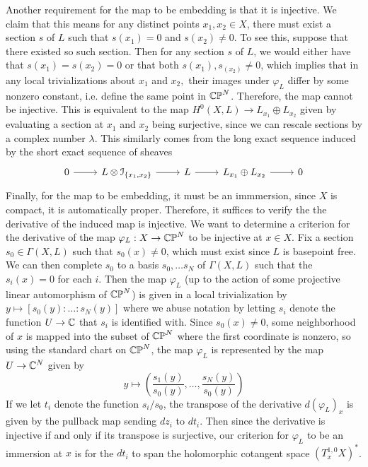 Another requirement for the map to be embedding is that it is injective.
We claim that this means for any distinct points $x_1,x_2 \in X$, there must exist
a section $s$ of $L$ such that $s(x_1) = 0$ and $s(x_2) \neq 0$. To see this,
suppose that there existed so such section. Then for any section $s$ of $L$,
we would either have that $s(x_1) = s(x_2) = 0$ or that both $s(x_1),s_(x_2) \neq 0$,
which implies that in any local trivializations about $x_1$ and $x_2,$ their images
under $\varphi_L$ differ by some nonzero constant, i.e. define the same point in $\mathbb{CP}^N$.
Therefore, the map cannot be injective. This is equivalent
to the map $H^0(X,L) \to L_{x_1} \oplus L_{x_2}$ given by evaluating a section
at $x_1$ and $x_2$ being surjective, since we can rescale sections by a complex
number $\lambda$. This similarly comes from the long exact sequence induced
by the short exact sequence of sheaves
\[\begin{tikzcd}
0 \ar[r] & L \otimes \mathcal{I}_{\set{x_1,x_2}} \ar[r] & L \ar[r]
& L_{x_1} \oplus L_{x_2} \ar[r] & 0
\end{tikzcd}\]
Finally, for the map to be embedding, it must be an immmersion, since $X$ is
compact, it is automatically proper. Therefore, it suffices to verify the the
derivative of the induced map is injective. We want to determine a criterion
for the derivative of the map $\varphi_L : X \to \mathbb{CP}^N$ to be injective at $x \in X$.
Fix a section $s_0 \in \Gamma(X,L)$ such that $s_0(x) \neq 0$, which must exist
since $L$ is basepoint free. We can then complete $s_0$ to a basis
$s_0, \ldots s_N$ of $\Gamma(X,L)$ such that the $s_i(x) = 0$ for each $i$.
Then the map $\varphi_L$ (up to the action of some projective linear automorphism
of $\mathbb{CP}^N$) is given in a local trivialization by $y \mapsto [s_0(y):\ldots : s_N(y)]$
where we abuse notation by letting $s_i$ denote the function $U \to \mathbb{C}$ that $s_i$ is
identified with. Since $s_0(x) \neq 0$, some neighborhood of $x$ is mapped into the
subset of $\mathbb{CP}^N$ where the first coordinate is nonzero, so using the standard
chart on $\mathbb{CP}^N$, the map $\varphi_L$ is represented by the map $U \to \mathbb{C}^N$
given by
\[
y \mapsto \left(\frac{s_1(y)}{s_0(y)},\ldots , \frac{s_N(y)}{s_0(y)}\right)
\]
If we let $t_i$ denote the function $s_i/s_0$, the transpose of the
derivative $d(\varphi_L)_x$ is given by the pullback map sending
$dz_i$ to $dt_i$. Then since the derivative is injective if and only if its
transpose is surjective, our criterion for $\varphi_L$ to be an immersion at
$x$ is for the $dt_i$ to span the holomorphic cotangent space $(T^{1,0}_xX)^*$.
